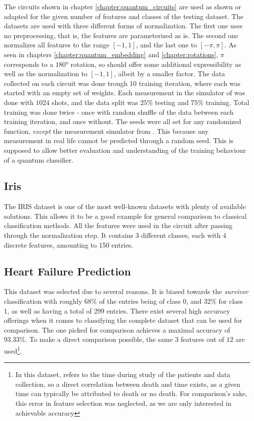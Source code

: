 The circuits shown in chapter \ref{chapter:quantum_circuits} are used as shown or adapted for the given number of features and classes of the testing dataset. The datasets are used with three different forms of normalization. The first one uses no preprocessing, that is, the features are parameterized as is. The second one normalizes all features to the range $[-1,1]$, and the last one to  $[-\pi,\pi]$. As seen in chapters \ref{chapter:quantum_embedding} and \ref{chapter:rotations}, $\pi$ corresponds to a $180°$ rotation, so should offer some additional expressibility as well as the normalization to $[-1,1]$, albeit by a smaller factor. The data collected on each circuit was done trough 10 training iteration, where each was started with an empty set of weights. Each measurement in the simulator of  was done with $1024$ shots, and the data split was $25\%$ testing and $75\%$ training. Total training was done twice - once with random shuffle of the data between each training iteration, and once without. The seeds were all set for any randomized function, \emph{except} the measurement simulator from . This because any measurement in real life cannot be predicted through a random seed. This is supposed to allow better evaluation and understanding of the training behaviour of a quantum classifier.


\subsection{Iris}
\label{chapter:iris}

The IRIS \cite{fisher_use_1936} dataset is one of the most well-known datasets with plenty of available solutions. This allows it to be a good example for general comparison to classical classification methods. All the features were used in the circuit after passing through the normalization step. It contains $3$ different classes, each with $4$ discrete features, amounting to 150 entries.

\subsection{Heart Failure Prediction}
\label{chapter:heart_failure_prediction}

This dataset \cite{ahmad_survival_2017} was selected due to several reasons. It is biased towards the \emph{survivor} classification with roughly 68\% of the entries being of class 0, and 32\% for class 1, as well as having a total of 299 entries. There exist several high accuracy offerings when it comes to classifying the complete dataset that can be used for comparison. The one picked for comparison\cite{sakhiya_heart_nodate} achieves a maximal accuracy of $93.33\%$. To make a direct comparison possible, the same $3$ features out of $12$ are used\footnote{In this dataset,  refers to the time during study of the patients and data collection, so a direct correlation between death and time exists, as a given time can typically be attributed to death or no death. For comparison’s sake, this error in feature selection was neglected, as we are only interested in achievable accuracy}.

